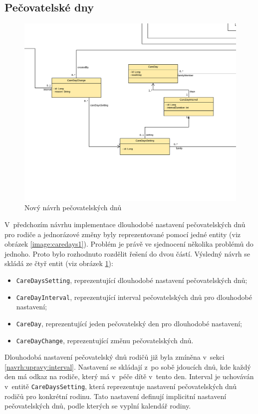     \subsection{Pečovatelské dny}\label{navrh:upravy:caredays} %
        \begin{figure}\centering
	       \includegraphics[width=1.0\textwidth]{pdfs/CareDays2}
	       \caption[Nový návrh pečovatelských dnů]{Nový návrh pečovatelských dnů}\label{image:caredays2}
        \end{figure}
        V~předchozím návrhu implementace dlouhodobé nastavení pečovatelských dnů pro rodiče a jednorázové změny byly reprezentované pomocí jedné entity (viz obrázek \ref{image:caredays1}). Problém je právě ve sjednocení několika problémů do jednoho. Proto bylo rozhodnuto rozdělit řešení do dvou částí. Výsledný návrh se skládá ze čtyř entit (viz obrázek \ref{image:caredays2}):
        \begin{itemize}
            \setlength\itemsep{0.3em}
            \item \texttt{CareDaysSetting}, reprezentující dlouhodobé nastavení pečovatelských dnů;
            \item \texttt{CareDayInterval}, reprezentující interval pečovatelských dnů pro dlouhodobé nastavení;
            \item \texttt{CareDay}, reprezentující jeden pečovatelský den pro dlouhodobé nastavení;
            \item \texttt{CareDayChange}, reprezentující změnu pečovatelských dnů.
        \end{itemize}
        Dlouhodobá nastavení pečovatelský dnů rodičů již byla zmíněna v~sekci \ref{navrh:upravy:interval}. Nastavení se skládají z~po sobě jdoucích dnů, kde každý den má odkaz na rodiče, který má v~péče dítě v~tento den. Interval je uchováván v~entitě \verb|CareDaysSetting|, která reprezentuje nastavení pečovatelských dnů rodičů pro konkrétní rodinu. Tato nastavení definují implicitní nastavení pečovatelských dnů, podle kterých se vyplní kalendář rodiny.
        
